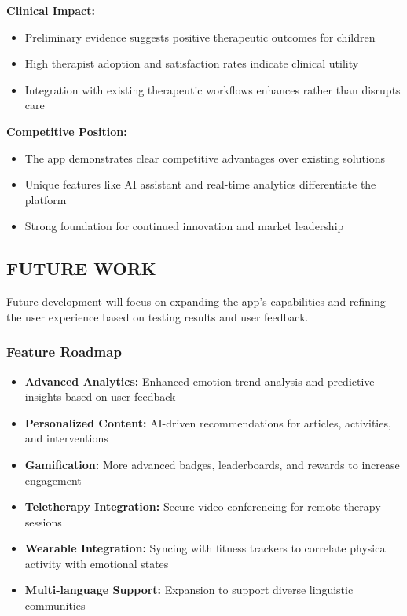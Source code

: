 ﻿\documentclass[12pt,a4paper]{article}
\newcommand{\sectiontitle}[1]{\subsection{#1}}
\newcommand{\subsectiontitle}[1]{\subsubsection{#1}}
\begin{document}
\textbf{Clinical Impact:}
\begin{itemize}
    \item Preliminary evidence suggests positive therapeutic outcomes for children
    \item High therapist adoption and satisfaction rates indicate clinical utility
    \item Integration with existing therapeutic workflows enhances rather than disrupts care
\end{itemize}

\textbf{Competitive Position:}
\begin{itemize}
    \item The app demonstrates clear competitive advantages over existing solutions
    \item Unique features like AI assistant and real-time analytics differentiate the platform
    \item Strong foundation for continued innovation and market leadership
\end{itemize}

\sectiontitle{FUTURE WORK}

Future development will focus on expanding the app's capabilities and refining the user experience based on testing results and user feedback.

\subsectiontitle{Feature Roadmap}

\begin{minipage}{\linewidth}
\begin{itemize}
    \item \textbf{Advanced Analytics:} Enhanced emotion trend analysis and predictive insights based on user feedback
    \item \textbf{Personalized Content:} AI-driven recommendations for articles, activities, and interventions
    \item \textbf{Gamification:} More advanced badges, leaderboards, and rewards to increase engagement
    \item \textbf{Teletherapy Integration:} Secure video conferencing for remote therapy sessions
    \item \textbf{Wearable Integration:} Syncing with fitness trackers to correlate physical activity with emotional states
    \item \textbf{Multi-language Support:} Expansion to support diverse linguistic communities
\end{itemize}
\end{minipage}
\end{document}
